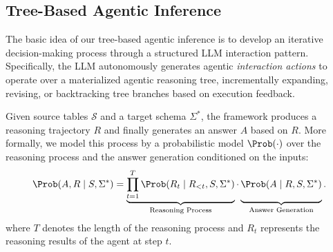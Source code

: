 \subsection{Tree-Based Agentic Inference}
\label{subsec:agentic_tree_based_definition}

The basic idea of our tree-based agentic inference is to develop an iterative decision-making process through a structured LLM interaction pattern.
Specifically, the LLM autonomously generates agentic \emph{interaction actions} to operate over a materialized agentic reasoning tree, incrementally expanding, revising, or backtracking tree branches based on execution feedback.

Given source tables $\mathcal{S}$ and a target schema $\Sigma^\ast$, the framework produces a reasoning trajectory $R$ and finally generates an answer $A$ based on $R$.
More formally, we model this process by a probabilistic model $\Prob(\cdot)$ over the reasoning process and the answer generation conditioned on the inputs: 
\begin{equation}
\label{eq:overall_agentic_inference}
\Prob(A,R \mid S,\Sigma^*) = 
\underbrace{\prod_{t=1}^{T} \Prob(R_t \mid R_{<t}, S, \Sigma^\ast)}_{\text{Reasoning Process}} 
 \cdot 
\underbrace{\Prob(A \mid R, S, \Sigma^*) \vphantom{\prod_{t}^{T}}}_{\text{Answer Generation}}.
\end{equation}
where $T$ denotes the length of the reasoning process and $R_t$ represents the reasoning results of the agent at step $t$.

